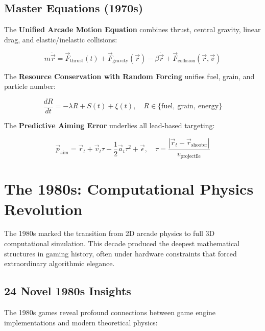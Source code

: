 \documentclass[11pt,a4paper]{article}
\theoremstyle{definition}
\begin{document}
\subsection{Master Equations (1970s)}

The \textbf{Unified Arcade Motion Equation} combines thrust, central gravity, linear drag, and elastic/inelastic collisions:

\begin{equation}\label{eq:1970s-motion}
\boxed{m\ddot{\vec{r}} = \vec{F}_{\text{thrust}}(t) + \vec{F}_{\text{gravity}}(\vec{r}) - \beta\dot{\vec{r}} + \vec{F}_{\text{collision}}(\vec{r},\vec{v})}
\end{equation}

The \textbf{Resource Conservation with Random Forcing} unifies fuel, grain, and particle number:

\begin{equation}\label{eq:1970s-resource}
\boxed{\frac{dR}{dt} = -\lambda R + S(t) + \xi(t), \quad R \in \{\text{fuel},\ \text{grain},\ \text{energy}\}}
\end{equation}

The \textbf{Predictive Aiming Error} underlies all lead-based targeting:

\begin{equation}\label{eq:1970s-aiming}
\boxed{\vec{p}_{\text{aim}} = \vec{r}_t + \vec{v}_t\tau - \frac{1}{2}\vec{a}_t\tau^2 + \vec{\epsilon}, \quad \tau = \frac{|\vec{r}_t - \vec{r}_{\text{shooter}}|}{v_{\text{projectile}}}}
\end{equation}

\section{The 1980s: Computational Physics Revolution}\label{sec:1980s}

The 1980s marked the transition from 2D arcade physics to full 3D computational simulation. This decade produced the deepest mathematical structures in gaming history, often under hardware constraints that forced extraordinary algorithmic elegance.

\subsection{24 Novel 1980s Insights}

The 1980s games reveal profound connections between game engine implementations and modern theoretical physics:
\end{document}
